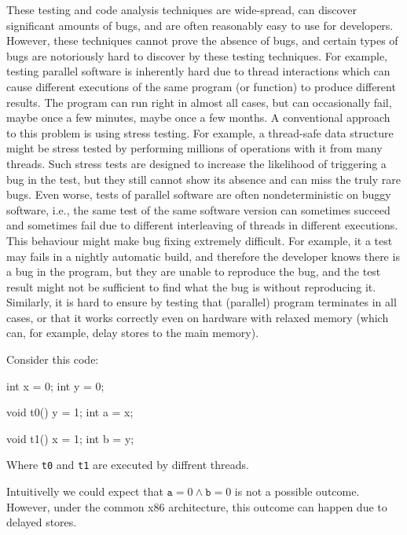These testing and code analysis techniques are wide-spread, can discover significant amounts of bugs, and are often reasonably easy to use for developers.
However, these techniques cannot prove the absence of bugs, and certain types of bugs are notoriously hard to discover by these testing techniques.
For example, testing parallel software is inherently hard due to thread interactions which can cause different executions of the same program (or function) to produce different results.
The program can run right in almost all cases, but can occasionally fail, maybe once a few minutes, maybe once a few months.
A conventional approach to this problem is using stress testing.
For example, a thread-safe data structure might be stress tested by performing millions of operations with it from many threads.
Such stress tests are designed to increase the likelihood of triggering a bug in the test, but they still cannot show its absence and can miss the truly rare bugs.
Even worse, tests of parallel software are often nondeterministic on buggy software, i.e., the same test of the same software version can sometimes succeed and sometimes fail due to different interleaving of threads in different executions.
This behaviour might make bug fixing extremely difficult.
For example, it a test may fails in a nightly automatic build, and therefore the developer knows there is a bug in the program, but they are unable to reproduce the bug, and the test result might not be sufficient to find what the bug is without reproducing it.
Similarly, it is hard to ensure by testing that (parallel) program terminates in all cases, or that it works correctly even on hardware with relaxed memory (which can, for example, delay stores to the main memory).\begin{marginnote}%
Consider this code:

\medskip
\begin{cppcode}
int x = 0;
int y = 0;

void t0() {
  y = 1;
  int a = x;
}

void t1() {
  x = 1;
  int b = y;
}
\end{cppcode}

Where \texttt{t0} and \texttt{t1} are executed by diffrent threads.

Intuitivelly we could expect that $\texttt{a} = 0 \land \texttt{b} = 0$ is not a possible outcome.
However, under the common x86 architecture, this outcome can happen due to delayed stores.
\end{marginnote}

